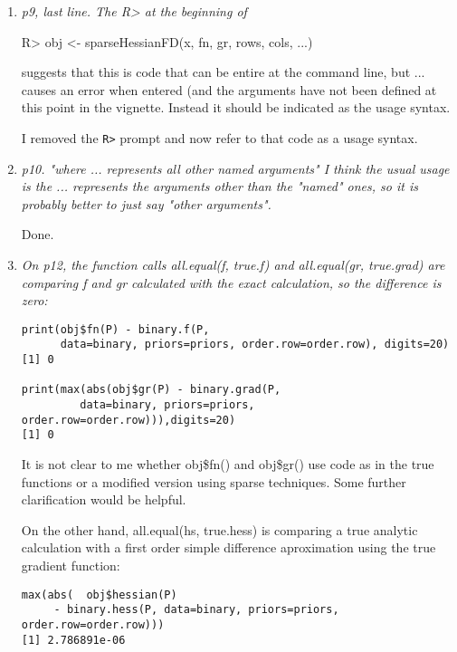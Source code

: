 \documentclass{article}
\newcommand{\code}[1]{\texttt{#1}}
\newcommand{\func}[1]{\code{#1}}
\newenvironment{revQuote}{\itshape}{\vspace{\baselineskip}}
\newenvironment{response}{\normalfont}{\vspace{\baselineskip}}
\begin{document}
\begin{enumerate}
\begin{response}
  
\end{response}


\item \begin{revQuote}
p9, last line. The R> at the beginning of
 
   R> obj <- sparseHessianFD(x, fn, gr, rows, cols, ...)

suggests that this is code that can be entire at the command line, but ...
causes an error when entered (and the arguments have not been defined at
this point in the vignette. Instead it should be indicated as the usage
syntax.
  \end{revQuote}

\begin{response}
  I removed the \func{R>} prompt and now refer to that code as a usage
  syntax.  
\end{response}


\item \begin{revQuote}
p10. "where ... represents all other named arguments"
   I think the usual usage is the ... represents the arguments other than
the "named" ones, so it is probably better to just say "other arguments".
  \end{revQuote}

\begin{response}
  Done.
\end{response}


\item \begin{revQuote}
On p12, the function calls all.equal(f, true.f) and all.equal(gr,
true.grad) are comparing f and gr calculated with the exact calculation, so
the difference is zero:

\begin{verbatim}
print(obj$fn(P) - binary.f(P, 
      data=binary, priors=priors, order.row=order.row), digits=20)
[1] 0

print(max(abs(obj$gr(P) - binary.grad(P, 
         data=binary, priors=priors,
order.row=order.row))),digits=20)
[1] 0

\end{verbatim}

It is not clear to me whether obj\$fn() and obj\$gr() use code as in the true
functions or a modified version using sparse techniques. Some further
clarification would be helpful.

On the other hand, all.equal(hs, true.hess) is comparing a true analytic
calculation with a first order simple difference aproximation using the true
gradient function:
\begin{verbatim}
max(abs(  obj$hessian(P)
     - binary.hess(P, data=binary, priors=priors, order.row=order.row)))
[1] 2.786891e-06
\end{verbatim}


\end{revQuote}
\end{enumerate}
\end{document}
